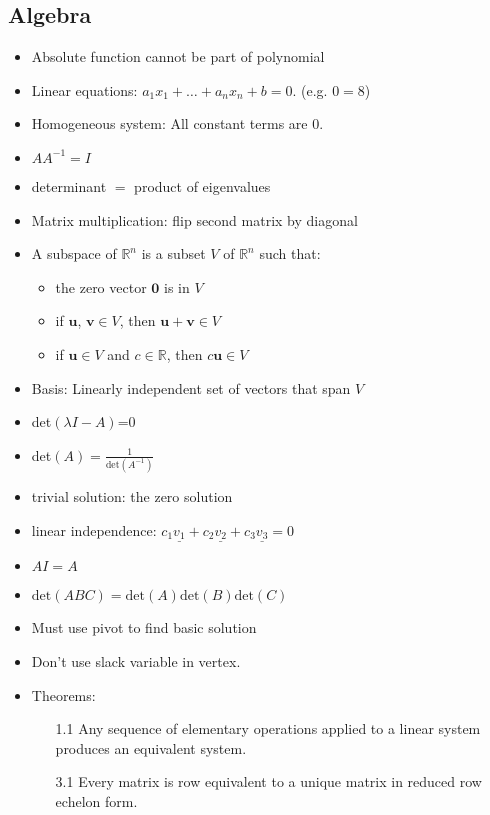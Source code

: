 \documentclass{article}
\begin{document}
\begin{multicols}{2}
\section{Algebra}
\begin{itemize}[leftmargin=0.5cm]
    \item Absolute function cannot be part of polynomial
    \item Linear equations: $a_1x_1+\ldots+a_nx_n+b=0$. (e.g. $0=8$)
    \item Homogeneous system: All constant terms are 0.
    \item $AA^{-1}=I$
    \item determinant $=$ product of eigenvalues
    \item Matrix multiplication: flip second matrix by diagonal
    \item A subspace of $\mathbb{R}^n$ is a subset $V$ of $\mathbb{R}^n$ such that: \begin{itemize}
        \item the zero vector $\textbf{0}$ is in $V$
        \item if $\textbf{u}$, $\textbf{v} \in V$, then $\textbf{u}+\textbf{v}\in V$
        \item if $\textbf{u}\in V$ and $c\in\mathbb{R}$, then $c\textbf{u}\in V$
    \end{itemize}
    \item Basis: Linearly independent set of vectors that span $V$
    \item det$(\lambda I-A)$=0
    \item det$(A)=\frac{1}{\text{det}(A^{-1})}$
    \item trivial solution: the zero solution
    \item linear independence: $c_1\underline{v_1}+c_2\underline{v_2}+c_3\underline{v_3}=0$
    \item $AI=A$
    \item $\text{det}(ABC)=\text{det}(A)\text{det}(B)\text{det}(C)$
    \item Must use pivot to find basic solution
    \item Don't use slack variable in vertex.
    \item Theorems:
        \begin{enumerate}
            \item[1.1] Any sequence of elementary operations applied to a linear system produces an equivalent system.
            \item[3.1] Every matrix is row equivalent to a unique matrix in reduced row echelon form.

\end{enumerate}
\end{itemize}
\end{multicols}
\end{document}

